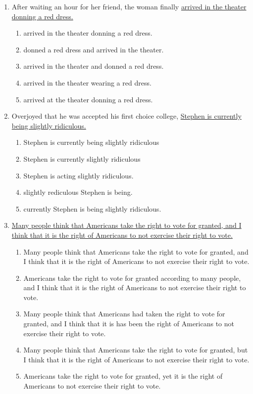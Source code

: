 \begin{enumerate}
\bigskip
\item After waiting an hour for her friend, the woman finally \ul{arrived in the theater donning a red dress.}

\bigskip
\begin{enumerate}[label=(\Alph*)]
\item arrived in the theater donning a red dress.\hrulefill
\item donned a red dress and arrived in the theater. \hrulefill
\item arrived in the theater and donned a red dress. \hrulefill
\item arrived in the theater wearing a red dress.\hrulefill
\item arrived at the theater donning a red dress.\hrulefill
\end{enumerate}

\bigskip
\item Overjoyed that he was accepted his first choice college, \ul{Stephen is currently being slightly ridiculous.}

\bigskip
\begin{enumerate}[label=(\Alph*)]
\item Stephen is currently being slightly ridiculous \hrulefill
\item Stephen is currently slightly ridiculous\hrulefill
\item Stephen is acting slightly ridiculous.\hrulefill
\item slightly rediculous Stephen is being. \hrulefill
\item currently Stephen is being slightly ridiculous.\hrulefill
\end{enumerate}

\bigskip
\item \ul{Many people think that Americans take the right to vote for granted, and I think that it is the right of Americans to not exercise their right to vote.}

\bigskip
\begin{enumerate}[label=(\Alph*)]
\item Many people think that Americans take the right to vote for granted, and I think that it is the right of Americans to not exercise their right to vote. \hrulefill
\item Americans take the right to vote for granted according to many people, and I think that it is the right of Americans to not exercise their right to vote.\hrulefill
\item Many people think that Americans had taken the right to vote for granted, and I think that it is has been the right of Americans to not exercise their right to vote. \hrulefill
\item Many people think that Americans take the right to vote for granted, but I think that it is the right of Americans to not exercise their right to vote.\hrulefill
\item Americans take the right to vote for granted, yet it is the right of Americans to not exercise their right to vote.\hrulefill
\end{enumerate}


\end{enumerate}
